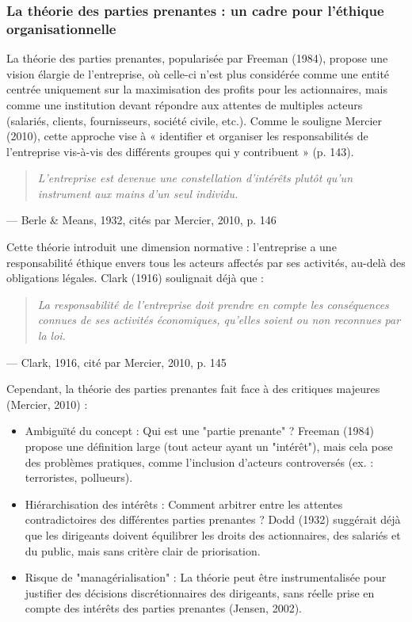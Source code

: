 \documentclass[12pt,a4paper]{report}
\begin{document}
\subsubsection{La théorie des parties prenantes : un cadre pour l'éthique organisationnelle}

La théorie des parties prenantes, popularisée par Freeman (1984), propose une vision élargie de l'entreprise, où celle-ci n'est plus considérée comme une entité centrée uniquement sur la maximisation des profits pour les actionnaires, mais comme une institution devant répondre aux attentes de multiples acteurs (salariés, clients, fournisseurs, société civile, etc.). Comme le souligne Mercier (2010), cette approche vise à « identifier et organiser les responsabilités de l’entreprise vis-à-vis des différents groupes qui y contribuent » (p. 143).

\begin{quote}
    \textit{L’entreprise est devenue une constellation d’intérêts plutôt qu’un instrument aux mains d’un seul individu.}
\end{quote}
\hfill --- Berle \& Means, 1932, cités par Mercier, 2010, p. 146

Cette théorie introduit une dimension normative : l’entreprise a une responsabilité éthique envers tous les acteurs affectés par ses activités, au-delà des obligations légales. Clark (1916) soulignait déjà que :
\begin{quote}
    \textit{La responsabilité de l’entreprise doit prendre en compte les conséquences connues de ses activités économiques, qu’elles soient ou non reconnues par la loi.}
\end{quote}
\hfill --- Clark, 1916, cité par Mercier, 2010, p. 145

Cependant, la théorie des parties prenantes fait face à des critiques majeures (Mercier, 2010) :
\begin{itemize}
    \item Ambiguïté du concept : Qui est une "partie prenante" ? Freeman (1984) propose une définition large (tout acteur ayant un "intérêt"), mais cela pose des problèmes pratiques, comme l'inclusion d'acteurs controversés (ex. : terroristes, pollueurs).\\
    \item Hiérarchisation des intérêts : Comment arbitrer entre les attentes contradictoires des différentes parties prenantes ? Dodd (1932) suggérait déjà que les dirigeants doivent équilibrer les droits des actionnaires, des salariés et du public, mais sans critère clair de priorisation.\\
    \item Risque de "managérialisation" : La théorie peut être instrumentalisée pour justifier des décisions discrétionnaires des dirigeants, sans réelle prise en compte des intérêts des parties prenantes (Jensen, 2002).\\
\end{itemize}
\end{document}

